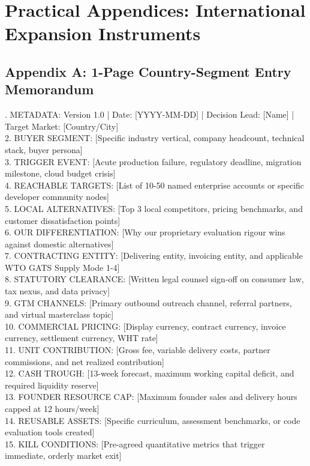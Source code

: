 \section{Practical Appendices: International Expansion Instruments}

\subsection{Appendix A: 1-Page Country-Segment Entry Memorandum}

\begin{tcolorbox}[colback=BayesCanvas,colframe=BayesDark,arc=1mm,title=\textbf{Template: 1-Page Country-Segment Entry Memorandum}]
\scriptsize{}. METADATA: Version 1.0 | Date: [YYYY-MM-DD] | Decision Lead: [Name] | Target Market: [Country/City]\\
2. BUYER SEGMENT: [Specific industry vertical, company headcount, technical stack, buyer persona]\\
3. TRIGGER EVENT: [Acute production failure, regulatory deadline, migration milestone, cloud budget crisis]\\
4. REACHABLE TARGETS: [List of 10-50 named enterprise accounts or specific developer community nodes]\\
5. LOCAL ALTERNATIVES: [Top 3 local competitors, pricing benchmarks, and customer dissatisfaction points]\\
6. OUR DIFFERENTIATION: [Why our proprietary evaluation rigour wins against domestic alternatives]\\
7. CONTRACTING ENTITY: [Delivering entity, invoicing entity, and applicable WTO GATS Supply Mode 1-4]\\
8. STATUTORY CLEARANCE: [Written legal counsel sign-off on consumer law, tax nexus, and data privacy]\\
9. GTM CHANNELS: [Primary outbound outreach channel, referral partners, and virtual masterclass topic]\\
10. COMMERCIAL PRICING: [Display currency, contract currency, invoice currency, settlement currency, WHT rate]\\
11. UNIT CONTRIBUTION: [Gross fee, variable delivery costs, partner commissions, and net realized contribution]\\
12. CASH TROUGH: [13-week forecast, maximum working capital deficit, and required liquidity reserve]\\
13. FOUNDER RESOURCE CAP: [Maximum founder sales and delivery hours capped at 12 hours/week]\\
14. REUSABLE ASSETS: [Specific curriculum, assessment benchmarks, or code evaluation tools created]\\
15. KILL CONDITIONS: [Pre-agreed quantitative metrics that trigger immediate, orderly market exit]
\end{tcolorbox}

